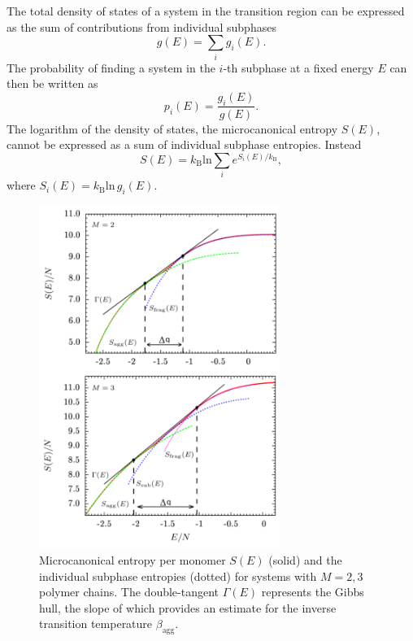 \documentclass[12pt]{report}
\begin{document}
%
The total density of states of a system in the transition region can be
expressed as the sum of contributions from individual subphases
%
\begin{equation}
g(E) = \sum_{i} g_{i}(E).
\label{eq:densOfStates}
\end{equation}
%
The probability of finding a system in the $i$-th subphase at a fixed
energy $E$ can then be written as
%
\begin{equation}
p_{i}(E) = \frac{g_{i}(E)}{g(E)}.
\label{eq:multProb}
\end{equation}
%
The logarithm of the density of states, the microcanonical entropy $S(E)$,
cannot be expressed as a sum of individual subphase entropies. Instead
%
\begin{equation}
S(E) = k_{\mathrm{B}}\mathrm{ln}\sum_{i}e^{S_{i}(E)/k_{\mathrm{B}}},
\label{eq:micEntropy}
\end{equation}
%
where $S_{i}(E) = k_{\mathrm{B}}\mathrm{ln}\, g_{i}(E)$.
%
\begin{figure}
\center
\includegraphics[width = 0.7\textwidth]{chapter7Figs/entropyCombined.eps}
\caption{\label{fig:Fig_4} Microcanonical entropy per
monomer $S(E)$ (solid)
and the individual subphase entropies (dotted) for systems with 
$M = 2,3$ polymer chains. The double-tangent $\Gamma (E)$
represents the Gibbs hull, the slope of which provides an estimate
for the inverse transition temperature $\beta_{\mathrm{agg}}$.}
\end{figure}
\end{document}
